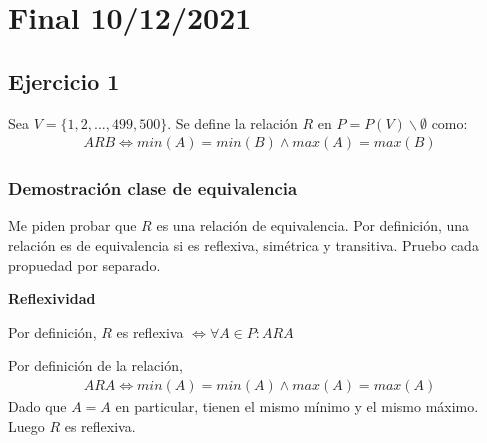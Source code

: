 
\usepackage{caratula}
\usepackage{enumerate}
\usepackage{hyperref}
\usepackage{graphicx}
\usepackage{amsfonts}
\usepackage{enumitem}
\usepackage{amsmath}

\decimalpoint
\hypersetup{colorlinks=true, linkcolor=black, urlcolor=blue}
\setlength{\parindent}{0em}
\setlength{\parskip}{0.5em}
\setcounter{tocdepth}{3} %
\setcounter{section}{0} %
\renewcommand{\thesubsubsection}{\thesubsection.\Alph{subsubsection}}
\graphicspath{ {images/} }





\maketitle
\newpage

\tableofcontents
\newpage

\section{Final 10/12/2021}

\subsection{Ejercicio 1}

Sea $ V = \{ 1,2,...,499,500 \} $. Se define la relación $R$ en $ P = P(V) \backslash \emptyset $ como:
\begin{align*}
    ARB \iff min(A) = min(B) \wedge max(A) = max(B)
\end{align*}

\subsubsection{Demostración clase de equivalencia}

Me piden probar que $R$ es una relación de equivalencia. Por definición, una relación es de equivalencia si es reflexiva, simétrica y transitiva. Pruebo cada propuedad por separado.

\textbf{Reflexividad}

Por definición, $R$ es reflexiva $ \iff \forall A \in P: ARA $

Por definición de la relación,
\begin{align*}
    ARA \iff min(A) = min(A) \wedge max(A) = max(A)
\end{align*}
Dado que $ A = A $ en particular, tienen el mismo mínimo y el mismo máximo. Luego $R$ es reflexiva.


